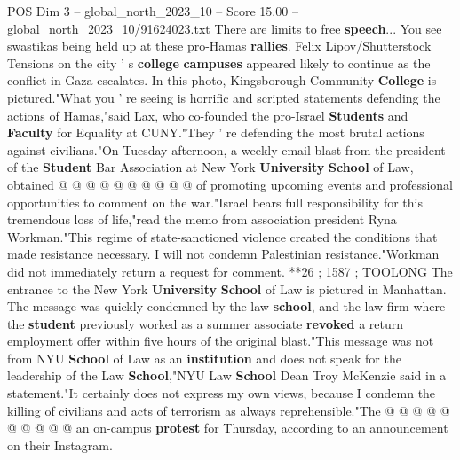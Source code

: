 \begin{textsample}{POS Dim 3 – global\_north\_2023\_10 – Score 15.00 – global\_north\_2023\_10/91624023.txt}
There are limits to free \textbf{speech}...
You see swastikas being held up at these pro-Hamas \textbf{rallies}.
Felix Lipov/Shutterstock Tensions on the city ' s \textbf{college} \textbf{campuses} appeared likely to continue as the conflict in Gaza escalates.
In this photo, Kingsborough Community \textbf{College} is pictured."What you ' re seeing is horrific and scripted statements defending the actions of Hamas,"said Lax, who co-founded the pro-Israel \textbf{Students} and \textbf{Faculty} for Equality at CUNY."They ' re defending the most brutal actions against civilians."On Tuesday afternoon, a weekly email blast from the president of the \textbf{Student} Bar Association at New York \textbf{University} \textbf{School} of Law, obtained @ @ @ @ @ @ @ @ @ @ of promoting upcoming events and professional opportunities to comment on the war."Israel bears full responsibility for this tremendous loss of life,"read the memo from association president Ryna Workman."This regime of state-sanctioned violence created the conditions that made resistance necessary.
I will not condemn Palestinian resistance."Workman did not immediately return a request for comment. **26 ; 1587 ; TOOLONG The entrance to the New York \textbf{University} \textbf{School} of Law is pictured in Manhattan.
The message was quickly condemned by the law \textbf{school}, and the law firm where the \textbf{student} previously worked as a summer associate \textbf{revoked} a return employment offer within five hours of the original blast."This message was not from NYU \textbf{School} of Law as an \textbf{institution} and does not speak for the leadership of the Law \textbf{School},"NYU Law \textbf{School} Dean Troy McKenzie said in a statement."It certainly does not express my own views, because I condemn the killing of civilians and acts of terrorism as always reprehensible."The @ @ @ @ @ @ @ @ @ @ an on-campus \textbf{protest} for Thursday, according to an announcement on their Instagram.

\end{textsample}
